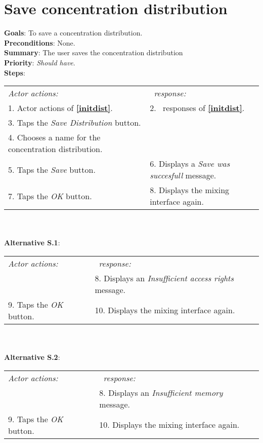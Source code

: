   \section{Save concentration distribution}
  \label{savedist}
  \textbf{Goals}: To save a concentration distribution.\\
  \textbf{Preconditions}: None. \\ %
  \textbf{Summary}: The user saves the concentration distribution\\
  \textbf{Priority}: \emph{Should have}.\\
  \textbf{Steps}: \\
  \begin{tabular}{ p{} p{} }
  	\emph{Actor actions:} & \emph{\projectname\ response:} \\
  	1. Actor actions of \textbf{\ref{initdist}}. & 2. \projectname\ responses of \textbf{\ref{initdist}}. \\
    3. Taps the \emph{Save Distribution} button.  & \\
    4. Chooses a name for the concentration distribution. & \\
    5. Taps the \emph{Save} button. & 6. Displays a \emph{Save was succesfull} message.\\
    7. Taps the \emph{OK} button. & 8. Displays the mixing interface again. \\
    \end{tabular}
    	 \\
    \\\textbf{Alternative S.1}: \\
    \begin{tabular}{ p{} p{} }
  	\emph{Actor actions:} & \emph{\projectname\ response:} \\
           &  8. Displays an \emph{Insufficient access rights} message. \\
	 9. Taps the \emph{OK} button. & 10. Displays the mixing interface again. \\
    \end{tabular}
    \\
    \\\textbf{Alternative S.2}: \\
    \begin{tabular}{ p{} p{} }
  	\emph{Actor actions:} & \emph{\projectname\ response:} \\
           &  8. Displays an \emph{Insufficient memory} message. \\
	 9. Taps the \emph{OK} button. & 10. Displays the mixing interface again. \\
    \end{tabular}
